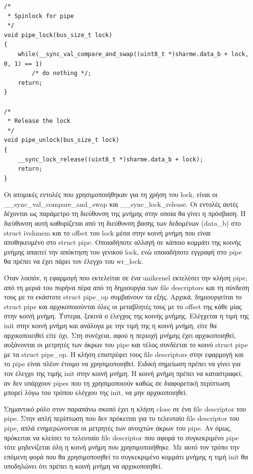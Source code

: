 \begin{lstlisting}
/*
 * Spinlock for pipe
 */
void pipe_lock(bus_size_t lock)
{
	while(__sync_val_compare_and_swap((uint8_t *)sharme.data_b + lock, 0, 1) == 1)
		/* do nothing */;
	return;
}

/*
 * Release the lock
 */
void pipe_unlock(bus_size_t lock)
{
	__sync_lock_release((uint8_t *)sharme.data_b + lock);
	return;
}

\end{lstlisting}

Οι ατομικές εντολές που χρησιμοποιήθηκαν για τη χρήση του lock, είναι οι
\_\_sync\_val\_compare\_and\_swap και \_\_sync\_lock\_release. Οι εντολές αυτές
δέχονται ως παράμετρο τη διεύθυνση της μνήμης στην οποία θα γίνει η πρόσβαση. Η
διεύθυνση αυτή καθορίζεται από τη διεύθυνση βασης των δεδομένων (data\_b) στο
struct ivshmem και το offset του lock μέσα στην κοινή μνήμη που είναι
αποθηκευμένο στο struct pipe. Οποιαδήποτε αλλαγή σε κάποιο κομμάτι της κοινής
μνήμης απαιτεί την απόκτηση του γενικού lock, ενώ οποιαδήποτε εγγραφή στο pipe
θα πρέπει να έχει πάρει τον έλεγχο του wr\_lock.

Όταν λοιπόν, η εφαρμογή που εκτελείται σε ένα unikernel εκτελέσει την κλήση
pipe, από τη μεριά του πυρήνα πέρα από τη δημιουργία των file descriptors και τη
σύνδεση τους με το εκάστοτε struct pipe\_op συμβαίνουν τα εξής. Αρχικά,
δημιουργείται το struct pipe και αρχικοποιούνται όλες οι μεταβλητές τους με το
offset της κάθε μίας στην κοινή μνήμη. Ύστερα, ξεκινά ο έλεγχος της κοινής
μνήμης. Ελέγχεται η τιμή της init στην κοινή μνήμη και ανάλογα με την τιμή της η
κοινή μνήμη, είτε θα αρχικοποιειθεί είτε όχι. Στη συνέχεια, αφού η περιοχή
μνήμης έχει αρχικοποιηθεί, αυξάνονται οι μετρητές των άκρων του pipe και τέλος
συνδέεται το κοινό struct pipe με τα struct pipe\_op. Η κλήση επιστρέφει τους
file descriptors στην εφαρμογή και το pipe είναι πλέον έτοιμο να
χρησιμοποιηθεί. Ειδική σημείωση πρέπει να γίνει για τον έλεγχο της τιμής init
στην κοινή μνήμη. Η κοινή μνήμη πρέπει να καταστραφεί, αν δεν υπάρχουν pipes που
τη χρησιμοποιούν καθώς σε διαφορετική περίπτωση μπορεί λόγω του τρόπου ελέγχου
της init, να μην αρχικοποιηθεί. 

Σημαντικό ρόλο στον παραπάνω σκοπό έχει η κλήση close σε ένα file descriptor του
pipe. Στην απλή περίπτωση που δεν πρόκειται για το τελευταίο file descriptor του
pipe, απλά ενημερώνονται οι μετρητές των ανοιχτών άκρων του pipe. Αν όμως,
πρόκειται να κλείσει το τελευταίο file descriptor που αφορά το συγκεκριμένο pipe
τότε μηδενίζεται όλη η κοινή μνήμη που χρησιμοποιήθηκε. Με αυτό τον τρόπο την
επόμενη φορά που θα χρησιμοποιηθεί το συγκεκριμένο κομμάτι μνήμης η τιμή init θα
υποδηλώνει ότι πρέπει η κοινή μνήμη να αρχικοποιηθεί. 


